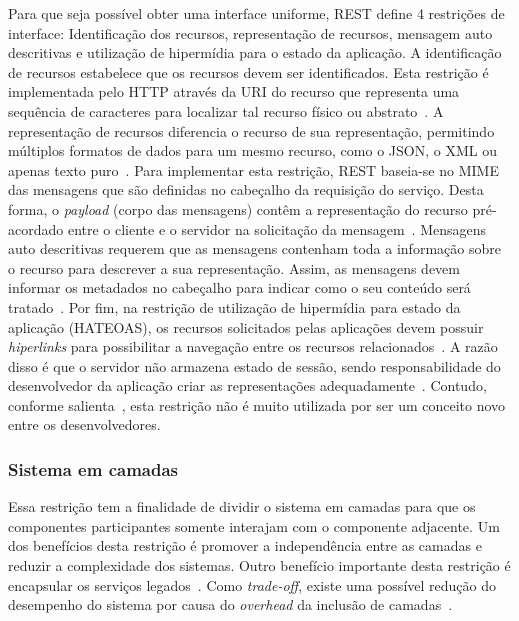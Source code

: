 Para que seja possível obter uma interface uniforme, \acrshort{REST} 
define 4 restrições de interface: Identificação dos recursos, 
representação de recursos, mensagem auto descritivas e utilização 
de hipermídia para o estado da aplicação. A identificação de recursos 
estabelece que os recursos devem ser identificados. Esta restrição é 
implementada pelo \acrshort{HTTP} através da \acrshort{URI} 
do recurso que representa 
uma sequência de caracteres para localizar tal recurso físico ou abstrato~\cite{berners2012rfc}.
A representação de recursos 
diferencia o recurso de sua representação, permitindo múltiplos formatos de dados 
para um mesmo recurso, como o JSON, o \acrshort{XML} 
ou apenas texto puro~\cite{fielding1999rfc}. Para implementar esta restrição, 
REST baseia-se no \acrfull{MIME} das mensagens que são definidas no 
cabeçalho da requisição do serviço. Desta forma, o \textit{payload} (corpo das mensagens) contêm a representação do 
recurso pré-acordado entre o cliente e o servidor na solicitação da mensagem~\cite{ModelDriApproRest:2014}.
Mensagens auto descritivas requerem que as mensagens contenham toda a informação sobre o recurso para descrever a sua 
representação. Assim, as mensagens devem informar os metadados no cabeçalho para indicar como o seu conteúdo 
será tratado~\cite{fielding2000architectural}. Por fim, na restrição de utilização de hipermídia para estado da aplicação (HATEOAS), 
os recursos solicitados pelas aplicações devem possuir \textit{hiperlinks} para possibilitar a navegação entre os recursos 
relacionados~\cite{RestApiDesign:2011}. A razão disso é que o servidor não armazena estado de sessão, sendo responsabilidade do 
desenvolvedor da aplicação criar as representações adequadamente~\cite{ModelDriApproRest:2014}. Contudo, 
conforme salienta~\cite{ModelDriApproRest:2014}, esta restrição não é muito utilizada por ser um conceito novo entre os desenvolvedores.


\subsubsection{Sistema em camadas}

Essa restrição tem a finalidade de dividir o sistema em camadas para que os componentes participantes 
somente interajam com o componente adjacente. Um dos benefícios desta restrição é promover a independência entre as 
camadas e reduzir a complexidade dos sistemas. Outro benefício importante desta restrição é encapsular os serviços 
legados~\cite{fielding2000architectural}. Como \textit{trade-off}, existe uma possível redução do desempenho do sistema por 
causa do \textit{overhead} da inclusão de camadas~\cite{ModelDriApproRest:2014}.



